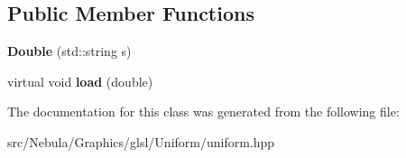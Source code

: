 \subsection*{\-Public \-Member \-Functions}
\begin{DoxyCompactItemize}
\item 
\hypertarget{classNeb_1_1glsl_1_1Uniform_1_1Scalar_1_1Double_a69bb07fb2fa171a1067bf7558b91ec57}{{\bfseries \-Double} (std\-::string s)}\label{classNeb_1_1glsl_1_1Uniform_1_1Scalar_1_1Double_a69bb07fb2fa171a1067bf7558b91ec57}

\item 
\hypertarget{classNeb_1_1glsl_1_1Uniform_1_1Scalar_1_1Double_a969f82ae833fc25a6a3c0a375f3bd375}{virtual void {\bfseries load} (double)}\label{classNeb_1_1glsl_1_1Uniform_1_1Scalar_1_1Double_a969f82ae833fc25a6a3c0a375f3bd375}

\end{DoxyCompactItemize}


\-The documentation for this class was generated from the following file\-:\begin{DoxyCompactItemize}
\item 
src/\-Nebula/\-Graphics/glsl/\-Uniform/uniform.\-hpp\end{DoxyCompactItemize}
